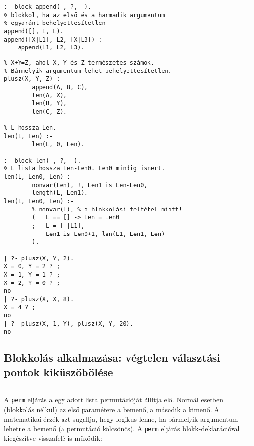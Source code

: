\begin{verbatim}
:- block append(-, ?, -).
% blokkol, ha az első és a harmadik argumentum 
% egyaránt behelyettesítetlen
append([], L, L).
append([X|L1], L2, [X|L3]) :-
    append(L1, L2, L3).
\end{verbatim}

\label{plusz3}
\begin{verbatim}
% X+Y=Z, ahol X, Y és Z természetes számok.
% Bármelyik argumentum lehet behelyettesítetlen.
plusz(X, Y, Z) :-
        append(A, B, C),
        len(A, X),
        len(B, Y),
        len(C, Z).

% L hossza Len.
len(L, Len) :-
        len(L, 0, Len).

:- block len(-, ?, -).
% L lista hossza Len-Len0. Len0 mindig ismert.
len(L, Len0, Len) :-
        nonvar(Len), !, Len1 is Len-Len0, 
        length(L, Len1).
len(L, Len0, Len) :- 
        % nonvar(L), % a blokkolási feltétel miatt!
        (   L == [] -> Len = Len0
        ;   L = [_|L1],
            Len1 is Len0+1, len(L1, Len1, Len)
        ).

| ?- plusz(X, Y, 2).
X = 0, Y = 2 ? ;
X = 1, Y = 1 ? ;
X = 2, Y = 0 ? ;
no
| ?- plusz(X, X, 8).
X = 4 ? ;
no
| ?- plusz(X, 1, Y), plusz(X, Y, 20).
no
\end{verbatim}

\subsection{Blokkolás alkalmazása: végtelen választási pontok kiküszöbölése}
\br

\hspace*{3mm}\rule[-5ex]{0.3mm}{11ex}\hspace*{-3mm}

\br

A {\tt perm} eljárás a egy adott lista permutációját állítja
elő. Normál esetben (blokkolás nélkül) az első paramétere a
bemenő, a második a kimenő. A matematikai érzék azt sugallja,
hogy logikus lenne, ha bármelyik argumentum lehetne a bemenő (a
permutáció kölcsönös). A {\tt perm} eljárás
blokk-deklarációval kiegészítve visszafelé is működik:

